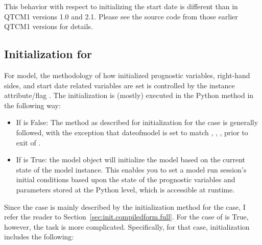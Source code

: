 This behavior with respect to initializing
the start date is different than in QTCM1 versions 1.0 and 2.1.
Please see the source code from those earlier QTCM1 versions for
details.




	\subsection{Initialization for 
			}
				\label{sec:init.compiledform.parts}

For  model, the methodology of how initialized
prognostic variables, right-hand sides, and start date related
variables are set is controlled by the  instance
attribute/flag .  The initialization
is (mostly) executed in the Python  method in the
following way:

\begin{itemize}
\item If  is False:
The method as described for
initialization for the 
 case is generally
followed, with the exception that dateofmodel is set
to match , , , prior to exit of 
.

\item If  is True:
the model object will initialize the model based on the current
state of the model instance.  This enables you to set a model run
session's initial conditions based upon the state of the prognostic
variables and parameters stored at the Python level, which is
accessible at runtime.
\end{itemize}


Since the 
case is mainly described by the initialization method for the
 case, I refer the
reader to Section~\ref{sec:init.compiledform.full}.
For the case of  is True, however,
the task is more complicated.  Specifically, for that case,
initialization includes the following:

